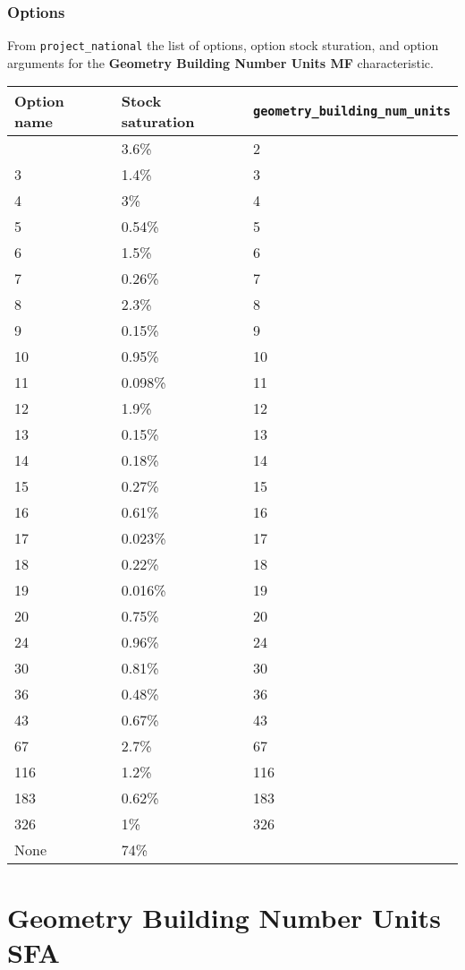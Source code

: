 \subsubsection{Options}\label{options-47}

From \texttt{project\_national} the list of options, option stock
sturation, and option arguments for the \textbf{Geometry Building Number
Units MF} characteristic.

\begin{longtable}[]{@{}lll@{}}
\toprule\noalign{}
Option name & Stock saturation &
\texttt{geometry\_building\_num\_units} \\
\midrule\noalign{}
\endhead
\bottomrule\noalign{}
\endlastfoot
2 & 3.6\% & 2 \\
3 & 1.4\% & 3 \\
4 & 3\% & 4 \\
5 & 0.54\% & 5 \\
6 & 1.5\% & 6 \\
7 & 0.26\% & 7 \\
8 & 2.3\% & 8 \\
9 & 0.15\% & 9 \\
10 & 0.95\% & 10 \\
11 & 0.098\% & 11 \\
12 & 1.9\% & 12 \\
13 & 0.15\% & 13 \\
14 & 0.18\% & 14 \\
15 & 0.27\% & 15 \\
16 & 0.61\% & 16 \\
17 & 0.023\% & 17 \\
18 & 0.22\% & 18 \\
19 & 0.016\% & 19 \\
20 & 0.75\% & 20 \\
24 & 0.96\% & 24 \\
30 & 0.81\% & 30 \\
36 & 0.48\% & 36 \\
43 & 0.67\% & 43 \\
67 & 2.7\% & 67 \\
116 & 1.2\% & 116 \\
183 & 0.62\% & 183 \\
326 & 1\% & 326 \\
None & 74\% & \\
\end{longtable}

\section{Geometry Building Number Units
SFA}\label{geometry_building_number_units_sfa}

